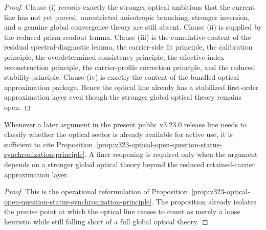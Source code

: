 \begin{proof}
Clause (i) records exactly the stronger optical ambitions that the current line has not yet proved: unrestricted anisotropic branching, stronger inversion, and a genuine global convergence theory are still absent. Clause (ii) is supplied by the reduced prism-readout lemma. Clause (iii) is the cumulative content of the residual spectral-diagnostic lemma, the carrier-side fit principle, the calibration principle, the overdetermined consistency principle, the effective-index reconstruction principle, the carrier-profile correction principle, and the reduced stability principle. Clause (iv) is exactly the content of the bundled optical approximation package. Hence the optical line already has a stabilized first-order approximation layer even though the stronger global optical theory remains open.
\end{proof}

\begin{corollary}
\label{cor:use-rule-for-the-synchronized-v323-optical-status-reading}
Whenever a later argument in the present public v3.23.0 release line needs to classify whether the optical sector is already available for active use, it is sufficient to cite Proposition~\ref{prop:v323-optical-open-question-status-synchronization-principle}. A finer reopening is required only when the argument depends on a stronger global optical theory beyond the reduced retained-carrier approximation layer.
\end{corollary}

\begin{proof}
This is the operational reformulation of Proposition~\ref{prop:v323-optical-open-question-status-synchronization-principle}. The proposition already isolates the precise point at which the optical line ceases to count as merely a loose heuristic while still falling short of a full global optical theory.
\end{proof}


